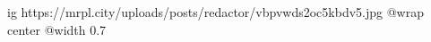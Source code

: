  
 
 
 
 

\ifcmt
  ig https://mrpl.city/uploads/posts/redactor/vbpvwds2oc5kbdv5.jpg
  @wrap center
  @width 0.7
\fi
